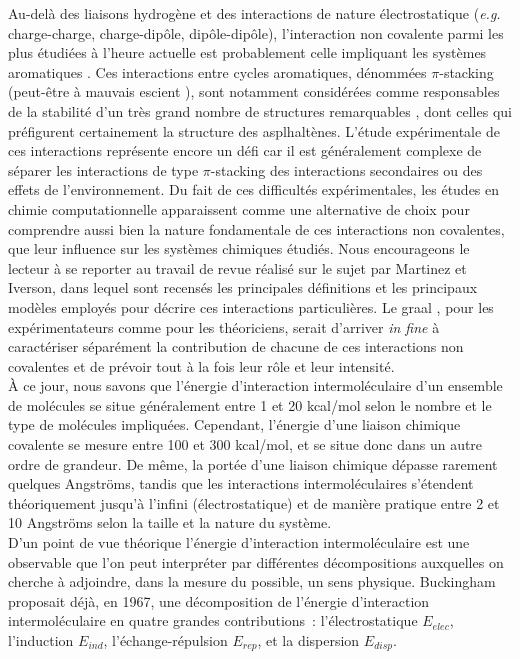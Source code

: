 	Au-delà des liaisons hydrogène et des interactions de nature électrostatique (\textit{e.g.} charge-charge, charge-dipôle, dipôle-dipôle), l’interaction non covalente parmi les plus étudiées à l’heure actuelle est probablement celle impliquant les systèmes aromatiques \cite{grimme2008special}. Ces interactions entre cycles aromatiques, dénommées \og $\pi$-stacking \fg{} (peut-être à mauvais escient \cite{martinez2012rethinking}), sont notamment considérées comme responsables de la stabilité d’un très grand nombre de structures remarquables \cite{mcgaughey1998pi}, dont celles qui préfigurent certainement la structure des asplhaltènes. L’étude expérimentale de ces interactions représente encore un défi car il est généralement complexe de séparer les interactions de type $\pi$-stacking des interactions secondaires ou des effets de l’environnement. Du fait de ces difficultés expérimentales, les études en chimie computationnelle apparaissent comme une alternative de choix pour comprendre aussi bien la nature fondamentale de ces interactions non covalentes, que leur influence sur les systèmes chimiques étudiés. Nous encourageons le lecteur à se reporter au travail de revue réalisé sur le sujet par Martinez et Iverson, dans lequel sont recensés les principales définitions et les principaux modèles employés pour décrire ces interactions particulières.
	Le \og graal \fg{}, pour les expérimentateurs comme pour les théoriciens, serait d’arriver \textit{in fine} à caractériser séparément la contribution de chacune de ces interactions non covalentes et de prévoir tout à la fois leur rôle et leur intensité.\\
	
	À ce jour, nous savons que l’énergie d'interaction intermoléculaire d'un ensemble de molécules se situe généralement entre 1 et 20 kcal/mol selon le nombre et le type de molécules impliquées. Cependant, l'énergie d'une liaison chimique covalente se mesure entre 100 et 300 kcal/mol, et se situe donc dans un autre ordre de grandeur. De même, la portée d’une liaison chimique dépasse rarement quelques Angströms, tandis que les interactions intermoléculaires s'étendent théoriquement jusqu'à l'infini (électrostatique) et de manière pratique entre 2 et 10 Angströms selon la taille et la nature du système.\\
	
	D’un point de vue théorique l’énergie d’interaction intermoléculaire est une observable que l’on peut interpréter par différentes décompositions auxquelles on cherche à adjoindre, dans la mesure du possible, un sens physique. Buckingham \cite{buckingham1967permanent} proposait déjà, en 1967, une décomposition de l’énergie d’interaction intermoléculaire en quatre grandes contributions : l’électrostatique $E_{elec}$, l’induction $E_{ind}$, l’échange-répulsion $E_{rep}$, et la dispersion $E_{disp}$.\\
	
